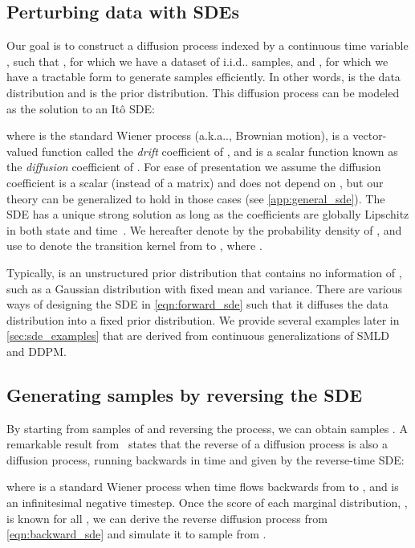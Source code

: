 \documentclass{article} \usepackage{iclr2021_conference,times}
\makeatletter
\def\@onedot{\ifx\@let@token.\else.\null\fi\xspace}
\DeclareRobustCommand\onedot{\futurelet\@let@token\@onedot}
\def\aka{a.k.a\onedot}
\def\iid{i.i.d\onedot}
\makeatother
\begin{document}
\subsection{Perturbing data with SDEs}\label{sec:sde_perturb}
Our goal is to construct a diffusion process  indexed by a continuous time variable , such that , for which we have a dataset of \iid samples, and , for which we have a tractable form to generate samples efficiently. In other words,  is the data distribution and  is the prior distribution. This diffusion process can be modeled as the solution to an It\^{o} SDE:

where  is the standard Wiener process (\aka, Brownian motion),  is a vector-valued function called the \emph{drift} coefficient of , and  is a scalar function known as the \emph{diffusion} coefficient of . For ease of presentation we assume the diffusion coefficient is a scalar (instead of a  matrix) and does not depend on , but our theory can be generalized to hold in those cases (see \cref{app:general_sde}). The SDE has a unique strong solution as long as the coefficients are globally Lipschitz in both state and time~\citep{oksendal2003stochastic}. We hereafter denote by  the probability density of , and use  to denote the transition kernel from  to , where .

Typically,  is an unstructured prior distribution that contains no information of , such as a Gaussian distribution with fixed mean and variance. There are various ways of designing the SDE in \cref{eqn:forward_sde} such that it diffuses the data distribution into a fixed prior distribution. We provide several examples later in \cref{sec:sde_examples} that are derived from continuous generalizations of SMLD and DDPM.

\subsection{Generating samples by reversing the SDE}\label{sec:sde_reverse}
By starting from samples of  and reversing the process, we can obtain samples . A remarkable result from~\citet{Anderson1982-ny} states that the reverse of a diffusion process is also a diffusion process, running backwards in time and given by the reverse-time SDE:

where  is a standard Wiener process
when time flows backwards from  to , and  is an infinitesimal negative timestep. Once the score of each marginal distribution, , is known for all , we can derive the reverse diffusion process from \cref{eqn:backward_sde} and simulate it to sample from .
\end{document}
